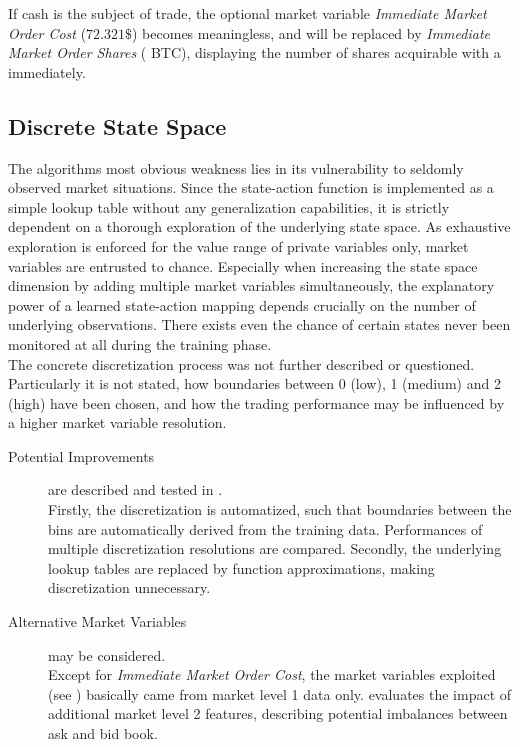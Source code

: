 If cash is the subject of trade, the optional market variable \emph{Immediate Market Order Cost}  (\eg $72.321\$$) becomes meaningless, and will be replaced by \emph{Immediate Market Order Shares} ( BTC), displaying the number of shares acquirable with a immediately.

\subsection{Discrete State Space}
The algorithms most obvious weakness lies in its vulnerability to seldomly observed market situations. Since the state-action function is implemented as a simple lookup table without any generalization capabilities, it is strictly dependent on a thorough exploration of the underlying state space. As exhaustive exploration is enforced for the value range of private variables only, market variables are entrusted to chance. Especially when increasing the state space dimension by adding multiple market variables simultaneously, the explanatory power of a learned state-action mapping depends crucially on the number of underlying observations. There exists even the chance of certain states never been monitored at all during the training phase.\\

The concrete discretization process was not further described or questioned. Particularly it is not stated, how boundaries between 0 (low), 1 (medium) and 2 (high) have been chosen, and how the trading performance may be influenced by a higher market variable resolution.

\begin{description}
\item[Potential Improvements] are described and tested in .\\
Firstly, the discretization is automatized, such that boundaries between the bins are automatically derived from the training data. Performances of multiple discretization resolutions are compared. Secondly, the underlying lookup tables are replaced by function approximations, making discretization unnecessary.
\item[Alternative Market Variables] may be considered.\\
Except for \emph{Immediate Market Order Cost}, the market variables exploited (see ) basically came from market level 1 data only.  evaluates the impact of additional market level 2 features, describing potential imbalances between ask and bid book.
\end{description}




